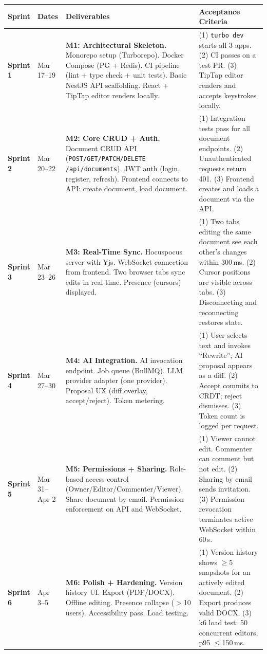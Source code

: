 \documentclass[10pt, a4paper]{article}
\begin{document}
{\small
\begin{tabularx}{\textwidth}{@{}l>{\raggedright}p{2.0cm}Xp{3.5cm}@{}}
\toprule
\textsf{\textbf{Sprint}} & \textsf{\textbf{Dates}} & \textsf{\textbf{Deliverables}} & \textsf{\textbf{Acceptance Criteria}} \\
\midrule
\textbf{Sprint 1} & Mar 17--19 &
  \textbf{M1: Architectural Skeleton.}
  Monorepo setup (Turborepo). Docker Compose (PG + Redis). CI pipeline (lint + type check + unit tests). Basic NestJS API scaffolding. React + TipTap editor renders locally. &
  (1) \texttt{turbo dev} starts all 3 apps.
  (2) CI passes on a test PR.
  (3) TipTap editor renders and accepts keystrokes locally. \\
\addlinespace[4pt]
\textbf{Sprint 2} & Mar 20--22 &
  \textbf{M2: Core CRUD + Auth.}
  Document CRUD API (\texttt{POST/GET/PATCH/DELETE /api/documents}). JWT auth (login, register, refresh). Frontend connects to API: create document, load document. &
  (1) Integration tests pass for all document endpoints.
  (2) Unauthenticated requests return 401.
  (3) Frontend creates and loads a document via the API. \\
\addlinespace[4pt]
\textbf{Sprint 3} & Mar 23--26 &
  \textbf{M3: Real-Time Sync.}
  Hocuspocus server with Yjs. WebSocket connection from frontend. Two browser tabs sync edits in real-time. Presence (cursors) displayed. &
  (1) Two tabs editing the same document see each other's changes within 300\,ms.
  (2) Cursor positions are visible across tabs.
  (3) Disconnecting and reconnecting restores state. \\
\addlinespace[4pt]
\textbf{Sprint 4} & Mar 27--30 &
  \textbf{M4: AI Integration.}
  AI invocation endpoint. Job queue (BullMQ). LLM provider adapter (one provider). Proposal UX (diff overlay, accept/reject). Token metering. &
  (1) User selects text and invokes ``Rewrite''; AI proposal appears as a diff.
  (2) Accept commits to CRDT; reject dismisses.
  (3) Token count is logged per request. \\
\addlinespace[4pt]
\textbf{Sprint 5} & Mar 31--Apr 2 &
  \textbf{M5: Permissions + Sharing.}
  Role-based access control (Owner/Editor/Commenter/Viewer). Share document by email. Permission enforcement on API and WebSocket. &
  (1) Viewer cannot edit. Commenter can comment but not edit.
  (2) Sharing by email sends invitation.
  (3) Permission revocation terminates active WebSocket within 60\,s. \\
\addlinespace[4pt]
\textbf{Sprint 6} & Apr 3--5 &
  \textbf{M6: Polish + Hardening.}
  Version history UI. Export (PDF/DOCX). Offline editing. Presence collapse ($>$10 users). Accessibility pass. Load testing. &
  (1) Version history shows $\ge$5 snapshots for an actively edited document.
  (2) Export produces valid DOCX.
  (3) k6 load test: 50 concurrent editors, p95 $\le$150\,ms. \\
\bottomrule
\end{tabularx}
}
\end{document}
